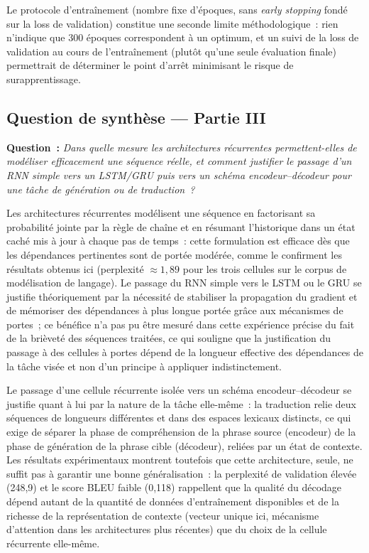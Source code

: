 \documentclass[11pt,a4paper]{article}
\begin{document}
Le protocole d'entraînement (nombre fixe d'époques, sans \emph{early stopping} fondé sur la loss de validation) constitue une seconde limite méthodologique~: rien n'indique que 300 époques correspondent à un optimum, et un suivi de la loss de validation au cours de l'entraînement (plutôt qu'une seule évaluation finale) permettrait de déterminer le point d'arrêt minimisant le risque de surapprentissage.

\subsection{Question de synthèse --- Partie III}

\noindent\textbf{Question~:} \textit{Dans quelle mesure les architectures récurrentes permettent-elles de modéliser efficacement une séquence réelle, et comment justifier le passage d'un RNN simple vers un LSTM/GRU puis vers un schéma encodeur--décodeur pour une tâche de génération ou de traduction~?}

\medskip
Les architectures récurrentes modélisent une séquence en factorisant sa probabilité jointe par la règle de chaîne et en résumant l'historique dans un état caché mis à jour à chaque pas de temps~: cette formulation est efficace dès que les dépendances pertinentes sont de portée modérée, comme le confirment les résultats obtenus ici (perplexité $\approx 1,89$ pour les trois cellules sur le corpus de modélisation de langage). Le passage du RNN simple vers le LSTM ou le GRU se justifie théoriquement par la nécessité de stabiliser la propagation du gradient et de mémoriser des dépendances à plus longue portée grâce aux mécanismes de portes~; ce bénéfice n'a pas pu être mesuré dans cette expérience précise du fait de la brièveté des séquences traitées, ce qui souligne que la justification du passage à des cellules à portes dépend de la longueur effective des dépendances de la tâche visée et non d'un principe à appliquer indistinctement.

Le passage d'une cellule récurrente isolée vers un schéma encodeur--décodeur se justifie quant à lui par la nature de la tâche elle-même~: la traduction relie deux séquences de longueurs différentes et dans des espaces lexicaux distincts, ce qui exige de séparer la phase de compréhension de la phrase source (encodeur) de la phase de génération de la phrase cible (décodeur), reliées par un état de contexte. Les résultats expérimentaux montrent toutefois que cette architecture, seule, ne suffit pas à garantir une bonne généralisation~: la perplexité de validation élevée (248,9) et le score BLEU faible (0,118) rappellent que la qualité du décodage dépend autant de la quantité de données d'entraînement disponibles et de la richesse de la représentation de contexte (vecteur unique ici, mécanisme d'attention dans les architectures plus récentes) que du choix de la cellule récurrente elle-même.
\end{document}
